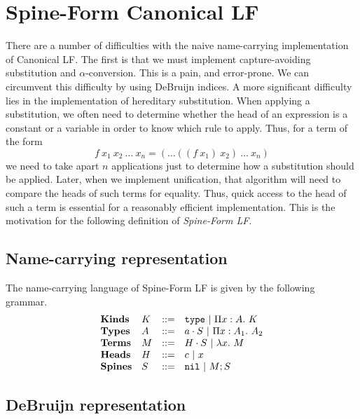 \documentclass[11pt,twoside]{article}
\begin{document}

\section{Spine-Form Canonical LF}

There are a number of difficulties with the naive name-carrying
implementation of Canonical LF.  The first is that we must
implement capture-avoiding substitution and $\alpha$-conversion.
This is a pain, and error-prone.  We can circumvent this difficulty
by using DeBruijn indices\cite{DeBruijn80}.  A more significant 
difficulty lies in the implementation of hereditary substitution. 
When applying a substitution, we often need to determine whether
the head of an expression is a constant or a variable in order
to know which rule to apply.  Thus, for a term of the form
$$f\ x_1\ x_2\ \ldots\ x_n = (\ldots((f\ x_1)\ x_2)\ \ldots\ x_n) $$
we need to take apart $n$ applications just to determine how
a substitution should be applied.  Later, when we implement
unification, that algorithm will need to compare the heads
of such terms for equality.  Thus, quick access to the head
of such a term is essential for a reasonably efficient implementation.
This is the motivation for the following definition of 
\emph{Spine-Form LF}.

\subsection{Name-carrying representation}

The name-carrying language of Spine-Form LF is given by the following
grammar.
$$
\begin{array}{llll}
\mathbf{Kinds} & K & ::= & \mathtt{type} \ |\  \Pi x : A.\ K \\
\mathbf{Types} & A & ::= & a\cdot S \ |\  \Pi x : A_1.\ A_2 \\
\mathbf{Terms} & M & ::= & H\cdot S \ |\  \lambda x.\ M \\
\mathbf{Heads} & H & ::= & c \ |\  x\\
\mathbf{Spines} & S & ::= & \mathtt{nil} \ |\  M;S\\
\end{array} 
$$

\subsection{DeBruijn representation}
\end{document}
